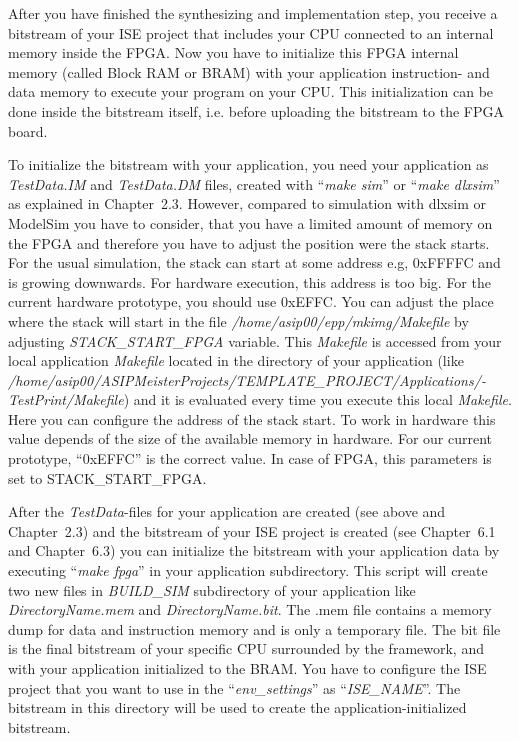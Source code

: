 After you have finished the synthesizing and implementation step, you
receive a bitstream of your ISE project that includes your CPU connected
to an internal memory inside the FPGA. Now you have to initialize this
FPGA internal memory (called Block RAM or BRAM) with your application
instruction- and data memory to execute your program on your CPU. This
initialization can be done inside the bitstream itself, i.e. before
uploading the bitstream to the FPGA board.

To initialize the bitstream with your application, you need your
application as \emph{TestData.IM} and \emph{TestData.DM} files, created
with ``\emph{make sim}'' or ``\emph{make dlxsim}'' as explained in
Chapter~2.3. However, compared to simulation with dlxsim or ModelSim you
have to consider, that you have a limited amount of memory on the FPGA
and therefore you have to adjust the position were the stack starts. For
the usual simulation, the stack can start at some address e.g, 0xFFFFC
and is growing downwards. For hardware execution, this address is too
big. For the current hardware prototype, you should use 0xEFFC. You can
adjust the place where the stack will start in the file
\emph{/home/asip00/epp/mkimg/Makefile} by adjusting
\emph{STACK\_START\_FPGA} variable. This \emph{Makefile} is accessed
from your local application \emph{Makefile} located in the directory of
your application (like
\emph{/home/asip00/­ASIPMeisterProjects/­TEMPLATE\_PROJECT/­Applications/­TestPrint/Makefile})
and it is evaluated every time you execute this local \emph{Makefile}.
Here you can configure the address of the stack start. To work in
hardware this value depends of the size of the available memory in
hardware. For our current prototype, ``0xEFFC'' is the correct value. In
case of FPGA, this parameters is set to STACK\_START\_FPGA.

After the \emph{TestData}-files for your application are created (see
above and Chapter~2.3) and the bitstream of your ISE project is created
(see Chapter~6.1 and Chapter~6.3) you can initialize the bitstream with
your application data by executing ``\emph{make fpga}'' in your
application subdirectory. This script will create two new files in
\emph{BUILD\_SIM} subdirectory of your application like
\emph{DirectoryName.mem} and \emph{DirectoryName.bit}. The .mem file
contains a memory dump for data and instruction memory and is only a
temporary file. The bit file is the final bitstream of your specific CPU
surrounded by the framework, and with your application initialized to
the BRAM. You have to configure the ISE project that you want to use in
the ``\emph{env\_settings}'' as ``\emph{ISE\_NAME}''. The bitstream in
this directory will be used to create the application-initialized
bitstream.

